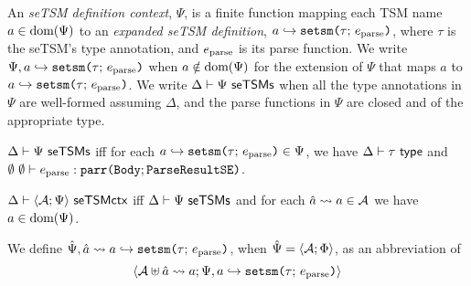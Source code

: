 An \emph{seTSM definition context}, $\Psi$, is a finite function mapping each TSM name $a \in \text{dom}(\Psi)$ to an \emph{expanded seTSM definition}, $a \hookrightarrow \texttt{setsm}\texttt{(}\tau;\,e_\text{parse}\texttt{)}$, where $\tau$ is the seTSM's type annotation, and $e_\text{parse}$ is its parse function. We write $\Psi, a \hookrightarrow \texttt{setsm}\texttt{(}\tau;\,e_\text{parse}\texttt{)}$ when $a \notin \text{dom}(\Psi)$ for the extension of $\Psi$ that maps $a$ to $a \hookrightarrow \texttt{setsm}\texttt{(}\tau;\,e_\text{parse}\texttt{)}$. We write $\Delta \vdash \Psi~\mathsf{seTSMs}$  when all the type annotations in $\Psi$ are well-formed assuming $\Delta$, and the parse functions in $\Psi$ are closed and of the appropriate type.

\begin{definition}\label{def:seTSM-def-ctx-formation} $\Delta \vdash \Psi~\mathsf{seTSMs}$ iff for each $a \hookrightarrow \texttt{setsm}\texttt{(}\tau;\,e_\text{parse}\texttt{)} \in \Psi$, we have $\Delta \vdash \tau~\mathsf{type}$ and $\emptyset~\emptyset \vdash e_\text{parse} : \texttt{parr}\texttt{(}\mathtt{Body}; \mathtt{ParseResultSE}\texttt{)}$.\end{definition}

\begin{definition} $\Delta \vdash \langle \mathcal{A}; \Psi \rangle~\mathsf{seTSMctx}$ iff $\Delta \vdash \Psi~\mathsf{seTSMs}$ and for each $\hat{a} \leadsto a \in \mathcal{A}$ we have $a \in \text{dom}(\Psi)$.
\end{definition}

We define $\hat{\Psi}, \hat{a} \leadsto a \hookrightarrow \texttt{setsm}\texttt{(}\tau;\,e_\text{parse}\texttt{)}$, when $\hat{\Psi}=\langle \mathcal{A}; \Phi \rangle$, as an abbreviation of \[\langle \mathcal{A} \uplus \hat{a} \leadsto a; \Psi, a \hookrightarrow \texttt{setsm}\texttt{(}\tau;\,e_\text{parse}\texttt{)} \rangle\]

